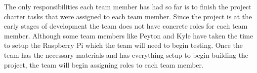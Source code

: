 The only responsibilities each team member has had so far is to finish the project charter tasks that were assigned to each team member. Since the project is at the early stages of development the team does not have concrete roles for each team member. Although some team members like Peyton and Kyle have taken the time to setup the Raspberry Pi which the team will need to begin testing. Once the team has the necessary materials and has everything setup to begin building the project, the team will begin assigning roles to each team member.
